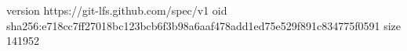 version https://git-lfs.github.com/spec/v1
oid sha256:e718cc7ff27018bc123bcb6f3b98a6aaf478add1ed75e529f891c834775f0591
size 141952
